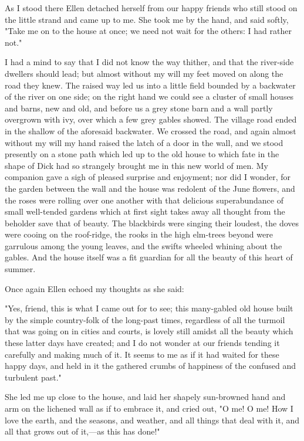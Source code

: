 As I stood there Ellen detached herself from our happy friends who still
stood on the little strand and came up to me. She took me by the hand,
and said softly, "Take me on to the house at once; we need not wait for
the others: I had rather not."

I had a mind to say that I did not know the way thither, and that the
river-side dwellers should lead; but almost without my will my feet
moved on along the road they knew. The raised way led us into a little
field bounded by a backwater of the river on one side; on the right hand
we could see a cluster of small houses and barns, new and old, and
before us a grey stone barn and a wall partly overgrown with ivy, over
which a few grey gables showed. The village road ended in the shallow of
the aforesaid backwater. We crossed the road, and again almost without
my will my hand raised the latch of a door in the wall, and we stood
presently on a stone path which led up to the old house to which fate in
the shape of Dick had so strangely brought me in this new world of men.
My companion gave a sigh of pleased surprise and enjoyment; nor did I
wonder, for the garden between the wall and the house was redolent of
the June flowers, and the roses were rolling over one another with that
delicious superabundance of small well-tended gardens which at first
sight takes away all thought from the beholder save that of beauty. The
blackbirds were singing their loudest, the doves were cooing on the
roof-ridge, the rooks in the high elm-trees beyond were garrulous among
the young leaves, and the swifts wheeled whining about the gables. And
the house itself was a fit guardian for all the beauty of this heart of
summer.

Once again Ellen echoed my thoughts as she said:

"Yes, friend, this is what I came out for to see; this many-gabled old
house built by the simple country-folk of the long-past times,
regardless of all the turmoil that was going on in cities and courts, is
lovely still amidst all the beauty which these latter days have created;
and I do not wonder at our friends tending it carefully and making much
of it. It seems to me as if it had waited for these happy days, and held
in it the gathered crumbs of happiness of the confused and turbulent
past."

She led me up close to the house, and laid her shapely sun-browned hand
and arm on the lichened wall as if to embrace it, and cried out, "O me!
O me! How I love the earth, and the seasons, and weather, and all things
that deal with it, and all that grows out of it,---as this has done!"

